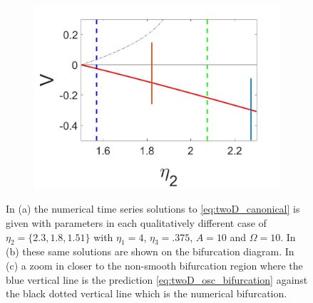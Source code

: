 \begin{figure}[H]
\begin{subfigure}{.5\textwidth}
  \includegraphics[width=\linewidth]{twoD/osc_bif_diagram_zoom.jpg}
  \caption{}
\end{subfigure}
\caption{In (a) the numerical time series solutions to \eqref{eq:twoD_canonical} is given with parameters in each qualitatively different case of $\eta_2=\{2.3,1.8,1.51\}$ with $\eta_1=4$, $\eta_3=.375$, $A=10$ and $\Omega = 10$. In (b) these same solutions are shown on the bifurcation diagram. In (c) a zoom in closer to the non-smooth bifurcation region where the blue vertical line is the prediction \eqref{eq:twoD_osc_bifurcation} against the black dotted vertical line which is the numerical bifurcation.}
\label{fig:twoD_osc_Vnumerics}
\end{figure}


